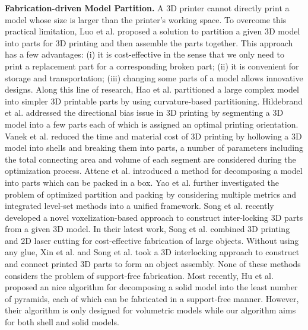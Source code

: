 \textbf{Fabrication-driven Model Partition.} A 3{D} printer cannot directly print a model whose size is larger than the printer's working space. To overcome this practical limitation, Luo et al. \cite{LuoBRM12} proposed a solution to partition a given 3D model into parts for 3D printing and then assemble the parts together. This approach has a few advantages: (i) it is cost-effective in the sense that we only need to print a replacement part for a corresponding broken part; (ii) it is convenient for storage and transportation; (iii) changing some parts of a model allows innovative designs. Along this line of research, Hao et al. \cite{hao2011efficient} partitioned a large complex model into simpler 3D printable parts by using curvature-based partitioning. Hildebrand et al. \cite{HildebrandBA13} addressed the directional bias issue in 3D printing by segmenting a 3D model into a few parts each of which is assigned an optimal printing orientation. Vanek et al. \cite{VanekGBMCSM14} reduced the time and material cost of 3D printing by hollowing a 3D model into shells and breaking them into parts, a number of parameters including the total connecting area and volume of each segment are considered during the optimization process. Attene et al. \cite{attene2015shapes} introduced a method for decomposing a model into parts which can be packed in a box. Yao et al. \cite{yao2015level} further investigated the problem of optimized partition and packing by considering multiple metrics and integrated level-set methods into a unified framework. Song et al. \cite{SongFLF15} recently developed a novel voxelization-based approach to construct inter-locking 3D parts from a given 3D model. In their latest work, Song et al. \cite{song2016cofifab} combined 3D printing and 2D laser cutting for cost-effective fabrication of large objects. Without using any glue, Xin et al. \cite{XinLFWHC11} and Song et al. \cite{SongFC12} took a 3D interlocking approach to construct and connect printed 3D parts to form an object assembly. None of these methods considers the problem of support-free fabrication. Most recently, Hu et al. \cite{Hu_siga14} proposed an nice algorithm for decomposing a solid model into the least number of pyramids, each of which can be fabricated in a support-free manner. However, their algorithm is only designed for volumetric models while our algorithm aims for both shell and solid models.







